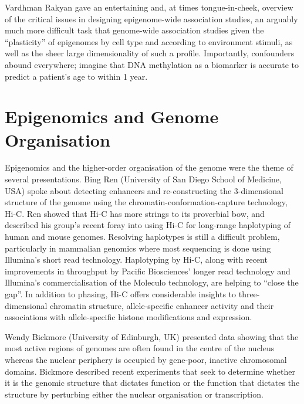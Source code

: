 \documentclass[twocolumn]{bmcart}%
\begin{document}
Vardhman Rakyan gave an entertaining and, at times tongue-in-cheek, overview of the critical issues in designing epigenome-wide association studies, an arguably much more difficult task that genome-wide association studies given the ``plasticity'' of epigenomes by cell type and according to environment stimuli, as well as the sheer large dimensionality of such a profile.  Importantly, confounders abound everywhere; imagine that DNA methylation as a biomarker is accurate to predict a patient's age to within 1 year.





\section*{Epigenomics and Genome Organisation}

Epigenomics and the higher-order organisation of the genome were the theme of several presentations. Bing Ren (University of San Diego School of Medicine, USA) spoke about detecting enhancers and re-constructing the 3-dimensional structure of the genome using the chromatin-conformation-capture technology, Hi-C. Ren showed that Hi-C has more strings to its proverbial bow, and described his group's recent foray into using Hi-C for long-range haplotyping of human and mouse genomes. Resolving haplotypes is still a difficult problem, particularly in mammalian genomics where most sequencing is done using Illumina's short read technology. Haplotyping by Hi-C, along with recent improvements in throughput by Pacific Biosciences' longer read technology and Illumina's commercialisation of the Moleculo technology, are helping to ``close the gap''.  In addition to phasing, Hi-C offers considerable insights to three-dimensional chromatin structure, allele-specific enhancer activity and their associations with allele-specific histone modifications and expression.

Wendy Bickmore (University of Edinburgh, UK) presented data showing that the most active regions of genomes are often found in the centre of the nucleus whereas the nuclear periphery is occupied by gene-poor, inactive chromosomal domains. Bickmore described recent experiments that seek to determine whether it is the genomic structure that dictates function or the function that dictates the structure by perturbing either the nuclear organisation or transcription.
\end{document}
